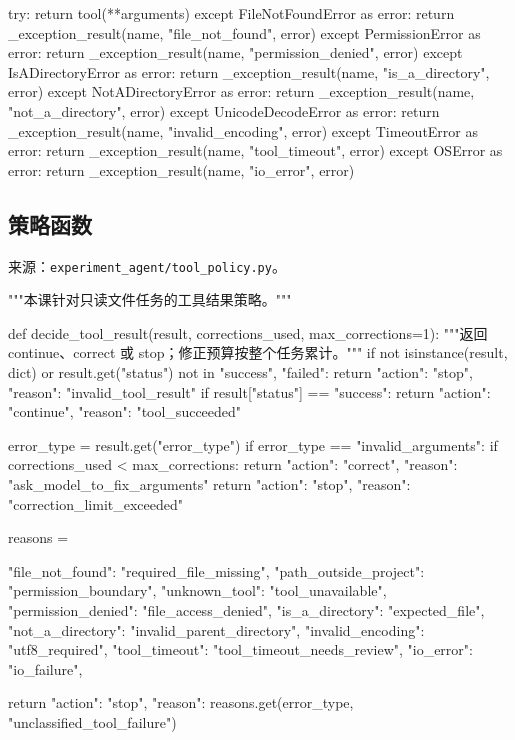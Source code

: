 \documentclass[UTF8,zihao=-4,fontset=fandol]{ctexart}
\begin{document}
\begin{Code}
    try:
        return tool(**arguments)
    except FileNotFoundError as error:
        return _exception_result(name, "file_not_found", error)
    except PermissionError as error:
        return _exception_result(name, "permission_denied", error)
    except IsADirectoryError as error:
        return _exception_result(name, "is_a_directory", error)
    except NotADirectoryError as error:
        return _exception_result(name, "not_a_directory", error)
    except UnicodeDecodeError as error:
        return _exception_result(name, "invalid_encoding", error)
    except TimeoutError as error:
        return _exception_result(name, "tool_timeout", error)
    except OSError as error:
        return _exception_result(name, "io_error", error)
\end{Code}

\subsection{策略函数}

来源：\nolinkurl{experiment_agent/tool_policy.py}。

\begin{Code}
"""本课针对只读文件任务的工具结果策略。"""


def decide_tool_result(result, corrections_used, max_corrections=1):
    """返回 continue、correct 或 stop；修正预算按整个任务累计。"""
    if not isinstance(result, dict) or result.get("status") not in {"success", "failed"}:
        return {"action": "stop", "reason": "invalid_tool_result"}
    if result["status"] == "success":
        return {"action": "continue", "reason": "tool_succeeded"}

    error_type = result.get("error_type")
    if error_type == "invalid_arguments":
        if corrections_used < max_corrections:
            return {"action": "correct", "reason": "ask_model_to_fix_arguments"}
        return {"action": "stop", "reason": "correction_limit_exceeded"}

    reasons = {
        "file_not_found": "required_file_missing",
        "path_outside_project": "permission_boundary",
        "unknown_tool": "tool_unavailable",
        "permission_denied": "file_access_denied",
        "is_a_directory": "expected_file",
        "not_a_directory": "invalid_parent_directory",
        "invalid_encoding": "utf8_required",
        "tool_timeout": "tool_timeout_needs_review",
        "io_error": "io_failure",
        
    }
    return {"action": "stop", "reason": reasons.get(error_type, "unclassified_tool_failure")}
\end{Code}
\end{document}
